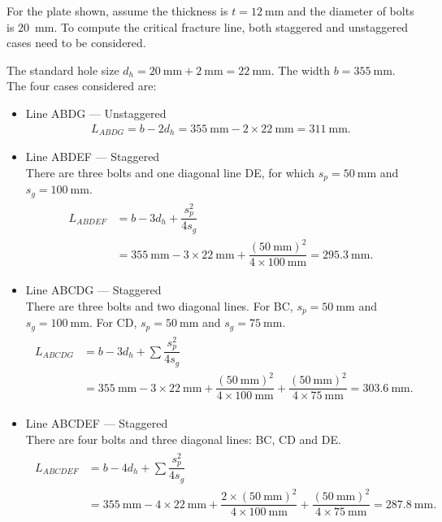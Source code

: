 \begin{exmp}
For the plate shown, assume the thickness is $t=\SI{12}{\mm}$ and the diameter of bolts is \SI{20}{\mm}.
To compute the critical fracture line, both staggered and unstaggered cases need to be considered.
\begin{figure}[H]\centering

\end{figure}
\end{exmp}
\begin{solution}
The standard hole size $d_h=\SI{20}{\mm}+\SI{2}{\mm}=\SI{22}{\mm}$.
The width $b=\SI{355}{\mm}$.
The four cases considered are:
\begin{itemize}
\item Line ABDG --- Unstaggered
\begin{gather*}
L_{ABDG}=b-2d_h=\SI{355}{\mm}-2\times\SI{22}{\mm}=\SI{311}{\mm}.
\end{gather*}
\item Line ABDEF --- Staggered\\
There are three bolts and one diagonal line DE, for which $s_p=\SI{50}{\mm}$ and $s_g=\SI{100}{\mm}$.
\begin{gather*}
\begin{split}
L_{ABDEF}&=b-3d_h+\dfrac{s_p^2}{4s_g}\\&=\SI{355}{\mm}-3\times\SI{22}{\mm}+\dfrac{\left(\SI{50}{\mm}\right)^2}{4\times\SI{100}{\mm}}=\SI{295.3}{\mm}.
\end{split}
\end{gather*}
\item Line ABCDG --- Staggered\\
There are three bolts and two diagonal lines.
For BC, $s_p=\SI{50}{\mm}$ and $s_g=\SI{100}{\mm}$.
For CD, $s_p=\SI{50}{\mm}$ and $s_g=\SI{75}{\mm}$.
\begin{gather*}
\begin{split}
L_{ABCDG}&=b-3d_h+\sum\dfrac{s_p^2}{4s_g}\\&=\SI{355}{\mm}-3\times\SI{22}{\mm}+\dfrac{\left(\SI{50}{\mm}\right)^2}{4\times\SI{100}{\mm}}+\dfrac{\left(\SI{50}{\mm}\right)^2}{4\times\SI{75}{\mm}}=\SI{303.6}{\mm}.
\end{split}
\end{gather*}
\item Line ABCDEF --- Staggered\\
There are four bolts and three diagonal lines: BC, CD and DE.
\begin{gather*}
\begin{split}
L_{ABCDEF}&=b-4d_h+\sum\dfrac{s_p^2}{4s_g}\\&=\SI{355}{\mm}-4\times\SI{22}{\mm}+\dfrac{2\times\left(\SI{50}{\mm}\right)^2}{4\times\SI{100}{\mm}}+\dfrac{\left(\SI{50}{\mm}\right)^2}{4\times\SI{75}{\mm}}=\SI{287.8}{\mm}.

\end{split}
\end{gather*}
\end{itemize}
\end{solution}
